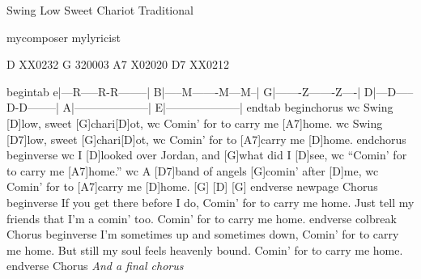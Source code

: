 Swing Low Sweet Chariot
Traditional

mycomposer
mylyricist


D XX0232
G 320003
A7 X02020
D7 XX0212


begintab
e|---R-----R-R--------|
B|-----M-------M---M--|
G|-------Z-------Z----|
D|---D-----D-D--------|
A|--------------------|
E|--------------------|
endtab
beginchorus
wc Swing [D]low, sweet [G]chari[D]ot,
wc Comin{\textquoteright} for to carry me [A7]home.
wc Swing [D7]low, sweet [G]chari[D]ot,
wc Comin{\textquoteright} for to [A7]carry me [D]home.
endchorus
beginverse
wc I [D]looked over Jordan, and [G]what did I [D]see,
wc    {\textquotedblleft}Comin{\textquoteright} for to carry me [A7]home.{\textquotedblright}
wc A [D7]band of angels [G]comin{\textquoteright} after [D]me,
wc    Comin{\textquoteright} for to [A7]carry me [D]home.     [G]     [D]     [G]
endverse
newpage
Chorus
beginverse
If you get there before I do,
   Comin{\textquoteright} for to carry me home.
Just tell my friends that I{\textquoteright}m a comin{\textquoteright} too.
   Comin{\textquoteright} for to carry me home.
endverse
colbreak
Chorus
beginverse
I{\textquoteright}m sometimes up and sometimes down,
   Comin{\textquoteright} for to carry me home.
But still my soul feels heavenly bound.
   Comin{\textquoteright} for to carry me home.
endverse
Chorus
\textit{And a final chorus}



